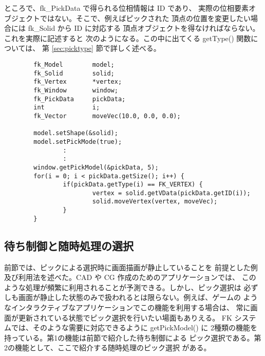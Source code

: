 ところで、fk\_PickData で得られる位相情報は ID であり、
実際の位相要素オブジェクトではない。そこで、例えばピックされた
頂点の位置を変更したい場合には fk\_Solid から ID に対応する
頂点オブジェクトを得なければならない。これを実際に記述すると
次のようになる。この中に出てくる getType() 関数については、
第 \ref{sec:picktype} 節で詳しく述べる。
\\
\begin{breakbox}
\begin{verbatim}
        fk_Model        model;
        fk_Solid        solid;
        fk_Vertex       *vertex;
        fk_Window       window;
        fk_PickData     pickData;
        int             i;
        fk_Vector       moveVec(10.0, 0.0, 0.0);

        model.setShape(&solid);
        model.setPickMode(true);
                :
                :
        window.getPickModel(&pickData, 5);
        for(i = 0; i < pickData.getSize(); i++) {
                if(pickData.getType(i) == FK_VERTEX) {
                        vertex = solid.getVData(pickData.getID(i));
                        solid.moveVertex(vertex, moveVec);
                }
        }
\end{verbatim}
\end{breakbox}
\subsection{待ち制御と随時処理の選択}
前節では、ピックによる選択時に画面描画が静止していることを
前提とした例及び利用法を述べた。CAD や CG 作成のためのアプリケーションでは、
このような処理が頻繁に利用されることが予測できる。しかし、ピック選択は
必ずしも画面が静止した状態のみで扱われるとは限らない。例えば、ゲームの
ようなインタラクティブなアプリケーションでこの機能を利用する場合は、
常に画面が更新されている状態でピック選択を行いたい場面もありえる。
FK システムでは、そのような需要に対応できるように getPickModel() に
2種類の機能を持っている。第1の機能は前節で紹介した待ち制御による
ピック選択である。第2の機能として、ここで紹介する随時処理のピック選択
がある。

